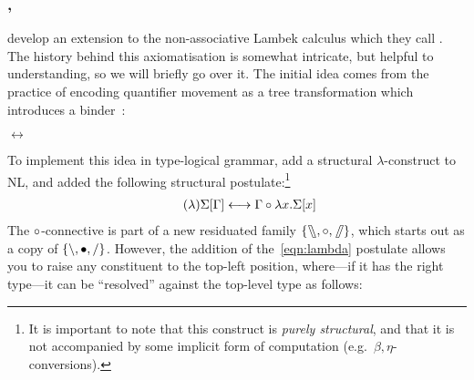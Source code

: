 \documentclass[10pt,a4paper]{llncs}
\begin{document}
\subsubsection*{{\NLLAM}, {\NLCL}}
\citet{barker2015} develop an extension to the non-associative Lambek
calculus \citep[NL;][]{lambek1961} which they call {\NLCL}. The history
behind this axiomatisation is somewhat intricate, but helpful to
understanding, so we will briefly go over it. The initial idea comes
from the practice of encoding quantifier movement as a tree
transformation which introduces a binder~\citep{heim1998}:
\begin{center}
  \begin{minipage}{0.4\linewidth}\centering
  \end{minipage}%
  \begin{minipage}{0.05\linewidth}\centering
    $\longleftrightarrow$
  \end{minipage}%
  \begin{minipage}{0.5\linewidth}\centering
  \end{minipage}
\end{center}
To implement this idea in type-logical grammar,
\citeauthor{barker2015} add a structural $\lambda$-construct to NL,
and added the following structural postulate:\footnote{%
  It is important to note that this construct is \emph{purely
  structural}, and that it is not accompanied by some implicit form of
  computation (e.g.\ $\beta,\eta$-conversions).
}
\begin{align}
  \tag{$\lambda$}
  \Sigma[\Gamma] \longleftrightarrow \Gamma\mathbin{\circ}\lambda{x}.\Sigma[x]
  \label{eqn:lambda}
\end{align}
The $\mathbin{\circ}$-connective is part of a new residuated family $\{\fatbslash,
\mathbin{\circ}, \mathbin{\!\fatslash\,}\}$, which starts out as a copy of $\{\backslash, \bullet,
\slash\}$. However, the addition of the~\eqref{eqn:lambda} postulate
allows you to raise any constituent to the top-left position,
where---if it has the right type---it can be ``resolved'' against the
top-level type as follows:
\vspace*{-1\baselineskip}
\end{document}
